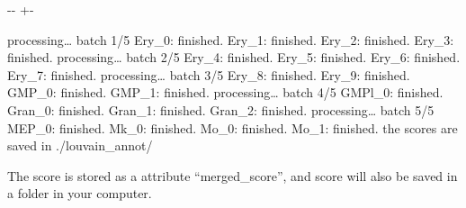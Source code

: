 \documentclass[letterpaper,10pt,english]{sphinxmanual}
\newlength\nbsphinxcodecellspacing
\begin{document}
%
{
\kern-\sphinxverbatimsmallskipamount\kern-\baselineskip
\kern+\FrameHeightAdjust\kern-\fboxrule
\vspace{\nbsphinxcodecellspacing}
%
\begin{sphinxVerbatim}[commandchars=\\\{\}]
processing{\ldots} batch 1/5
Ery\_0: finished.
Ery\_1: finished.
Ery\_2: finished.
Ery\_3: finished.
processing{\ldots} batch 2/5
Ery\_4: finished.
Ery\_5: finished.
Ery\_6: finished.
Ery\_7: finished.
processing{\ldots} batch 3/5
Ery\_8: finished.
Ery\_9: finished.
GMP\_0: finished.
GMP\_1: finished.
processing{\ldots} batch 4/5
GMPl\_0: finished.
Gran\_0: finished.
Gran\_1: finished.
Gran\_2: finished.
processing{\ldots} batch 5/5
MEP\_0: finished.
Mk\_0: finished.
Mo\_0: finished.
Mo\_1: finished.
the scores are saved in ./louvain\_annot/
\end{sphinxVerbatim}
}
\relax

The score is stored as a attribute “merged\_score”, and score will also be saved in a folder in your computer.

{
%
\begin{sphinxVerbatim}[commandchars=\\\{\}]
\llap{\color{nbsphinxin}[57]:\,\hspace{\fboxrule}\hspace{\fboxsep}}
\end{sphinxVerbatim}
}
\end{document}
